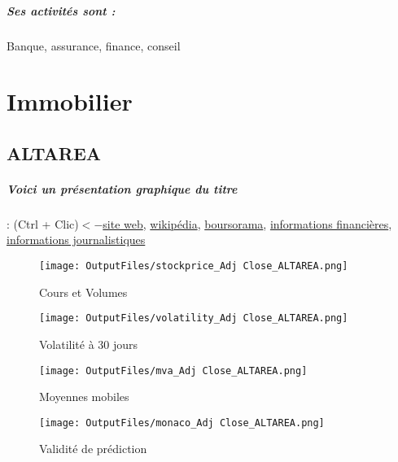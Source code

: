 \documentclass[11pt,a4paper]{report}%
\begin{document}
\paragraph{Ses activités sont : } Banque, assurance, finance, conseil 
    
    \newpage\chapter{Immobilier}


\section{ALTAREA}

\paragraph{Voici un présentation graphique du titre} : (Ctrl + Clic)$<-$\href{https://www.altarea.com/finance/espace-investisseur}{site web}, \href{https://fr.wikipedia.org/wiki/Altarea_Cogedim}{wikipédia}, \href{https://www.boursorama.com/cours/1rPALTA}{boursorama}, \href{https://www.qwant.com/?q=site:https:%2f%2fwww.easybourse.com%2faction-societe%2fALTAREA&t=web&client=ext-firefox-hp}{informations financières}, \href{https://bourse.lerevenu.com/cours-de-bourse/fiche-valeur-synthese/ALTAREA/ALTA-FR}{informations journalistiques}
\begin{figure}[!htb]
   \begin{minipage}{0.5\textwidth}
     \centering
     \texttt{[image: OutputFiles/stockprice\_Adj Close\_ALTAREA.png]}
     \caption{Cours et Volumes}\label{Fig:price_ALTAREA}
   \end{minipage}\hfill
   \begin{minipage}{0.5\textwidth}
     \centering
     \texttt{[image: OutputFiles/volatility\_Adj Close\_ALTAREA.png]}
     \caption{Volatilité à 30 jours}\label{Fig:volat_ALTAREA}
   \end{minipage}
\end{figure}
\begin{figure}[!htb]
   \begin{minipage}{0.5\textwidth}
     \centering
     \texttt{[image: OutputFiles/mva\_Adj Close\_ALTAREA.png]}
     \caption{Moyennes mobiles}\label{Fig:mva_ALTAREA}
   \end{minipage}\hfill
   \begin{minipage}{0.5\textwidth}
     \centering
     \texttt{[image: OutputFiles/monaco\_Adj Close\_ALTAREA.png]}
     \caption{Validité de prédiction}\label{Fig:prediction_ALTAREA}
   \end{minipage}
\end{figure}
\end{document}
